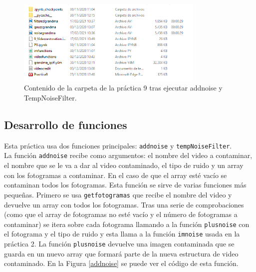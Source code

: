 \documentclass[a4paper,12pt]{report}
\begin{document}
\begin{figure}[h]
\centering
\includegraphics[width=0.8\textwidth]{imagenes/carpetaP9}
\caption{Contenido de la carpeta de la práctica 9 tras ejecutar addnoise y TempNoiseFilter.}
\label{carpetaP9} 
\end{figure}

\subsection{Desarrollo de funciones}

Esta práctica usa dos funciones principales: \texttt{addnoise} y \texttt{tempNoiseFilter}.\\

La función \texttt{addnoise} recibe como argumentos: el nombre del video a contaminar, el nombre que se le va a dar al video contaminado, el tipo de ruido y un array con los fotogramas a contaminar. En el caso de que el array esté vacío se contaminan todos los fotogramas. Esta función se sirve de varias funciones más pequeñas. Primero se usa \texttt{getfotogramas} que recibe el nombre del video y devuelve un array con todos los fotogramas. Tras una serie de comprobaciones (como que el array de fotogramas no esté vacío y el número de fotogramas a contaminar) se itera sobre cada fotograma llamando a la función \texttt{plusnoise} con el fotograma y el tipo de ruido y esta llama a la función \texttt{imnoise} usada en la práctica 2. La función \texttt{plusnoise} devuelve una imagen contaminada que se guarda en un nuevo array que formará parte de la nueva estructura de video contaminado. En la Figura \ref{addnoise} se puede ver el código de esta función.\\
\end{document}
